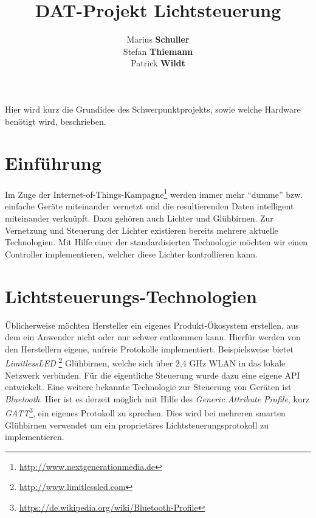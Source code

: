 \documentclass[a4paper,12pt]{article}
\begin{document}
\title{DAT-Projekt Lichtsteuerung}
\author{Marius \textbf{Schuller}\\
        Stefan \textbf{Thiemann}\\
		Patrick \textbf{Wildt}}
\maketitle

\tableofcontents

\newpage

\noindent
Hier wird kurz die Grundidee des Schwerpunktprojekts, sowie welche Hardware 
benötigt wird, beschrieben.

\section{Einführung}
\label{einfuehrung}

Im Zuge der Internet-of-Things-Kampagne\footnote{\url{http://www.nextgenerationmedia.de}}
werden immer mehr ``dumme'' bzw. einfache Geräte miteinander vernetzt und die
resultierenden Daten intelligent miteinander verknüpft. Dazu gehören auch Lichter und
Glühbirnen. Zur Vernetzung und Steuerung der Lichter existieren bereits mehrere
aktuelle Technologien. Mit Hilfe einer der standardisierten Technologie möchten wir
einen Controller implementieren, welcher diese Lichter kontrollieren kann.

\section{Lichtsteuerungs-Technologien}
\label{technology}

Üblicherweise möchten Hersteller ein eigenes Produkt-Ökosystem erstellen, aus dem ein
Anwender nicht oder nur schwer entkommen kann. Hierfür werden von den Herstellern
eigene, unfreie Protokolle implementiert. Beispielsweise bietet \textit{LimitlessLED}
\footnote{\url{http://www.limitlessled.com}} Glühbirnen, welche sich
über 2,4 GHz WLAN in das lokale Netzwerk verbinden. Für die eigentliche
Steuerung wurde dazu eine eigene API entwickelt. Eine weitere bekannte Technologie
zur Steuerung von Geräten ist \textit{Bluetooth}. Hier ist es derzeit möglich
mit Hilfe des \textit{Generic Attribute Profile}, kurz
\textit{GATT}\footnote{\url{https://de.wikipedia.org/wiki/Bluetooth-Profile}},
ein eigenes Protokoll zu sprechen. Dies wird bei mehreren smarten Glühbirnen
verwendet um ein proprietäres Lichtsteuerungsprotokoll zu implementieren.
\end{document}
